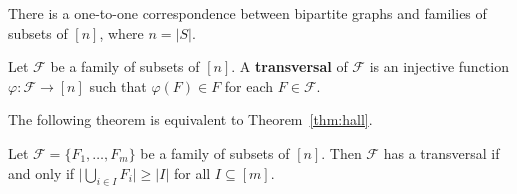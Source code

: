 \documentclass[11pt, a4paper]{ctexrep}
\begin{document}
There is a one-to-one correspondence between bipartite graphs and families of subsets of $[n]$, where $n=|S|$.

\begin{definition}
    Let $\mathcal{F}$ be a family of subsets of $[n]$.
    A \textbf{transversal} of $\mathcal{F}$ is an injective function $\varphi:\mathcal{F}\to[n]$ such that $\varphi(F)\in F$ for each $F\in\mathcal{F}$.
\end{definition}

The following theorem is equivalent to Theorem~\ref{thm:hall}.

\begin{theorem}\label{thm:transversal}
    Let $\mathcal{F}=\{F_1,\ldots,F_m\}$ be a family of subsets of $[n]$.
    Then $\mathcal{F}$ has a transversal if and only if $\bigl|\bigcup_{i\in I}F_i\bigr|\geqslant |I|$ for all $I\subseteq[m]$.
\end{theorem}
\end{document}

